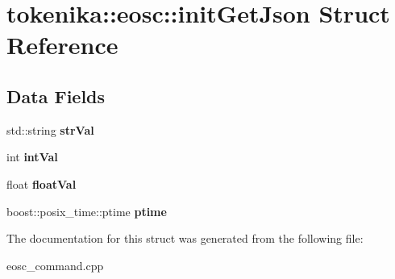 \hypertarget{structtokenika_1_1eosc_1_1init_get_json}{}\section{tokenika\+:\+:eosc\+:\+:init\+Get\+Json Struct Reference}
\label{structtokenika_1_1eosc_1_1init_get_json}
\subsection*{Data Fields}
\begin{DoxyCompactItemize}
\item 
\mbox{\label{structtokenika_1_1eosc_1_1init_get_json_adca4c31e7ac1cc23326ecd14d79e1803}} 
std\+::string {\bfseries str\+Val}
\item 
\mbox{\label{structtokenika_1_1eosc_1_1init_get_json_ad421117214d606a1be7588b4d8f6c28c}} 
int {\bfseries int\+Val}
\item 
\mbox{\label{structtokenika_1_1eosc_1_1init_get_json_ad50ad4c51196443286ceb98fe692c6f0}} 
float {\bfseries float\+Val}
\item 
\mbox{\label{structtokenika_1_1eosc_1_1init_get_json_af5e8ee4e572ad60492a72fc094fbbc0d}} 
boost\+::posix\+\_\+time\+::ptime {\bfseries ptime}
\end{DoxyCompactItemize}


The documentation for this struct was generated from the following file\+:\begin{DoxyCompactItemize}
\item 
eosc\+\_\+command.\+cpp\end{DoxyCompactItemize}

